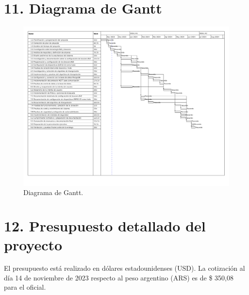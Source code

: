 \documentclass[
11pt, %
]{charter}
\begin{document}
\section{11. Diagrama de Gantt}
\begin{landscape}
\begin{figure}[htpb]
\centering 
\includegraphics[height=\textheight]{./Figuras/Gantt.pdf}
\caption{Diagrama de Gantt.}
\label{fig:diagGantt}
\end{figure}

\end{landscape}

\newpage
\section{12. Presupuesto detallado del proyecto}
\label{sec:presupuesto}

El presupuesto está realizado en dólares estadounidenses (USD). La cotización al día 14 de noviembre de 2023 respecto al peso argentino (ARS) es de {\$ 350,08} para el  oficial.
\end{document}
